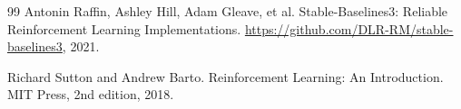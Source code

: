 \documentclass[10pt,twocolumn,letterpaper]{article}
\begin{document}
\begin{thebibliography}{99}
Antonin Raffin, Ashley Hill, Adam Gleave, et al.
\newblock Stable-Baselines3: Reliable Reinforcement Learning Implementations.
\newblock \url{https://github.com/DLR-RM/stable-baselines3}, 2021.

Richard Sutton and Andrew Barto.
\newblock Reinforcement Learning: An Introduction.
\newblock MIT Press, 2nd edition, 2018.

\end{thebibliography}
\end{document}
